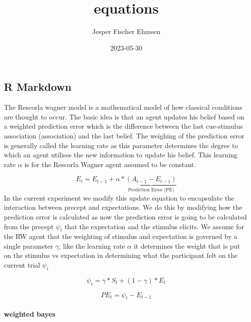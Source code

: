 \documentclass[
]{article}
\title{equations}
\author{Jesper Fischer Ehmsen}
\date{2023-05-30}
\begin{document}
\maketitle

\hypertarget{r-markdown}{%
\subsection{R Markdown}\label{r-markdown}}

The Rescorla wagner model is a mathematical model of how classical
conditions are thought to occur. The basic idea is that an agent updates
his belief based on a weighted prediction error which is the difference
between the last cue-stimulus association (association) and the last
belief. The weighing of the prediction error is generally called the
learning rate as this parameter determines the degree to which an agent
utilises the new information to update his belief. This learning rate
\(\alpha\) is for the Rescorla Wagner agent assumed to be constant.

\[
\begin{equation}
\tag{1}
E_t = E_{t-1}+\alpha*\underbrace{(A_{t-1}-E_{t-1})}_{\text{Prediction Error (PE)}}
\end{equation}
\] In the current experiment we modify this update equation to
encapsulate the interaction between precept and expectations. We do this
by modifying how the prediction error is calculated as now the
prediction error is going to be calculated from the precept \(\psi_t\)
that the expectation and the stimulus elicits. We assume for the RW
agent that the weighting of stimulus and expectation is governed by a
single parameter \(\gamma\), like the learning rate \(\alpha\) it
determines the weight that is put on the stimulus vs expectation in
determining what the participant felt on the current trial \(\psi_t\)

\[
\begin{equation}
\tag{2}
\psi_t = \gamma*S_t+(1-\gamma)*E_t
\end{equation}
\]

\[
\begin{equation}
\tag{3}
PE_t = \psi_t-E_{t-1}
\end{equation}
\]

\hypertarget{weighted-bayes}{%
\paragraph{weighted bayes}\label{weighted-bayes}}
\end{document}
